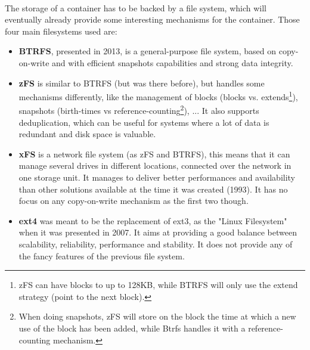 \paragraph{}The storage of a container has to be backed by a file system, which will eventually already provide some interesting mechanisms for the container.  Those four main filesystems used are:
\begin{itemize}
\renewcommand\labelitemi{--}
  \item \textbf{BTRFS}, presented in 2013, \cite{rodeh2013btrfs} is a general-purpose file system, based on copy-on-write and with efficient snapshots capabilities and strong data integrity.
  \item \textbf{zFS} is similar to BTRFS (but was there before), but handles some mechanisms differently, like the management of blocks (blocks vs. extends\footnote{zFS can have blocks to up to 128KB, while BTRFS will only use the extend strategy (point to the next block).}), snapshots (birth-times vs reference-counting\footnote{When doing snapshots, zFS will store on the block the time at which a new use of the block has been added, while Btrfs handles it with a reference-counting mechanism.}), ...  It also supports deduplication, which can be useful for systems where a lot of data is redundant and disk space is valuable.
  \item \textbf{xFS} is a network file system (as zFS and BTRFS), this means that it can manage several drives in different locations, connected over the network in one storage unit.  It manages to deliver better performances and availability than other solutions available at the time it was created (1993).\cite{wang1993xfs}  It has no focus on any copy-on-write mechanism as the first two though.
  \item \textbf{ext4} was meant to be the replacement of ext3, as the "Linux Filesystem" when it was presented in 2007. \cite{mathur2007new}  It aims at providing a good balance between scalability, reliability, performance and stability.  It does not provide any of the fancy features of the previous file system.
\end{itemize}

